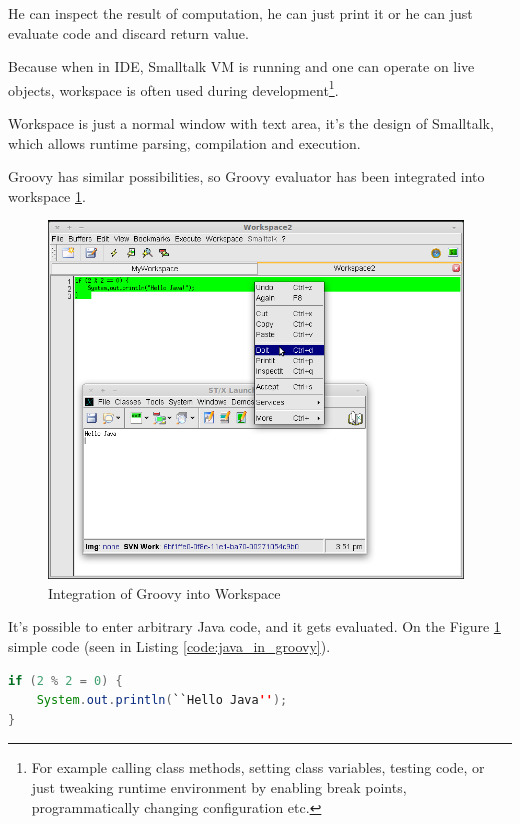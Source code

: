 \documentclass[11pt,twoside,a4paper]{book}
\begin{document}
He can inspect the result of computation, he can just print it or he can just evaluate code and discard return value. 

Because when in IDE, Smalltalk VM is running and one can operate on live objects, workspace is often used during development\footnote{For example calling class methods, setting class variables, testing code, or just tweaking runtime environment by enabling break points, programmatically changing configuration etc.}. 

Workspace is just a normal window with text area, it's the design of Smalltalk, which allows runtime parsing, compilation and execution.

Groovy has similar possibilities, so Groovy evaluator has been integrated into workspace \ref{fig:java_workspace}. 

\begin{figure}[ht]
	\begin{center}
		\includegraphics[width=11cm]{figures/java_workspace.png}
	\end{center}
	\caption{Integration of Groovy into Workspace}
	\label{fig:java_workspace}
\end{figure}

It's possible to enter arbitrary Java code, and it gets evaluated. On the Figure \ref{fig:java_workspace} simple code (seen in Listing \ref{code:java_in_groovy}).

\begin{lstlisting}[language=Java, caption=Java code executed by Groovy Workspace, label=code:java_in_groovy]
if (2 % 2 = 0) {
	System.out.println(``Hello Java'');
}
\end{lstlisting} 
\end{document}
